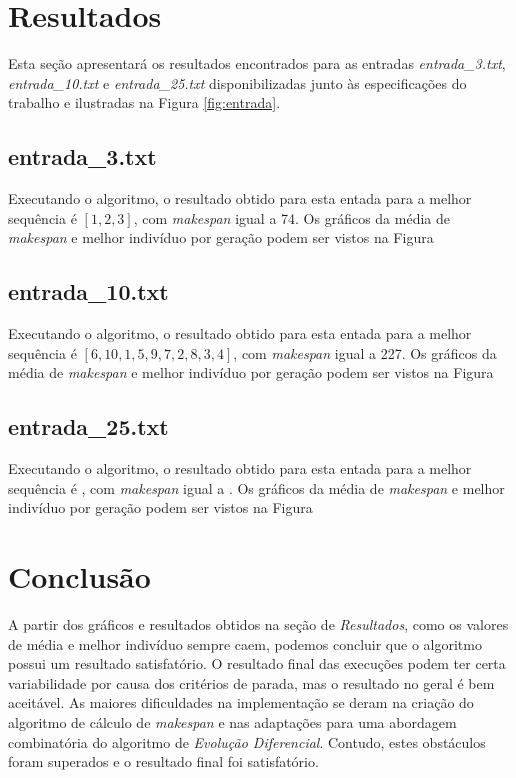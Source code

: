 \documentclass[12pt]{elsarticle}
\begin{document}
	\section{Resultados}
	Esta seção apresentará os resultados encontrados para as entradas \textit{entrada\_3.txt}, \textit{entrada\_10.txt} e \textit{entrada\_25.txt} disponibilizadas junto às especificações do trabalho e ilustradas na Figura \ref{fig:entrada}.
	
	\subsection{entrada\_3.txt}
	Executando o algoritmo, o resultado obtido para esta entada para a melhor sequência é $[1, 2, 3]$, com \textit{makespan} igual a 74. Os gráficos da média de \textit{makespan} e melhor indivíduo por geração podem ser vistos na Figura %
	
	\subsection{entrada\_10.txt}
	Executando o algoritmo, o resultado obtido para esta entada para a melhor sequência é $[6, 10, 1, 5, 9, 7, 2, 8, 3, 4]$, com \textit{makespan} igual a 227. Os gráficos da média de \textit{makespan} e melhor indivíduo por geração podem ser vistos na Figura %
	
	\subsection{entrada\_25.txt}
	Executando o algoritmo, o resultado obtido para esta entada para a melhor sequência é %
	, com \textit{makespan} igual a %
	. Os gráficos da média de \textit{makespan} e melhor indivíduo por geração podem ser vistos na Figura %
	
	\section{Conclusão}
	A partir dos gráficos e resultados obtidos na seção de \textit{Resultados}, como os valores de média e melhor indivíduo sempre caem, podemos concluir que o algoritmo possui um resultado satisfatório. O resultado final das execuções podem ter certa variabilidade por causa dos critérios de parada, mas o resultado no geral é bem aceitável. As maiores dificuldades na implementação se deram na criação do algoritmo de cálculo de \textit{makespan} e nas adaptações para uma abordagem combinatória do algoritmo de \textit{Evolução Diferencial}. Contudo, estes obstáculos foram superados e o resultado final foi satisfatório.
	
\end{document}
